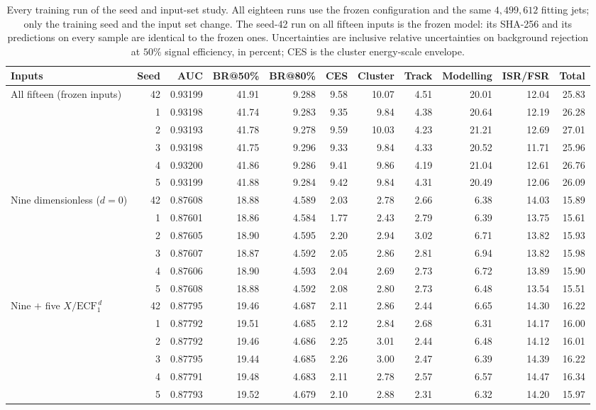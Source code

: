 \begin{table}[!ht]
\centering
\footnotesize
\setlength{\tabcolsep}{3pt}
\caption{Every training run of the seed and input-set study. All eighteen runs use the frozen configuration and the same $4{,}499{,}612$ fitting jets; only the training seed and the input set change. The seed-42 run on all fifteen inputs is the frozen model: its SHA-256 and its predictions on every sample are identical to the frozen ones. Uncertainties are inclusive relative uncertainties on background rejection at $50\%$ signal efficiency, in percent; CES is the cluster energy-scale envelope.}
\label{tab:supp-seed-runs}
\begin{tabular}{lrrrrrrrrrr}
\toprule
Inputs & Seed & AUC & BR@50\% & BR@80\% & CES & Cluster & Track & Modelling & ISR/FSR & Total \\
\midrule
All fifteen (frozen inputs) & 42 & 0.93199 & 41.91 & 9.288 & 9.58 & 10.07 & 4.51 & 20.01 & 12.04 & 25.83 \\
 & 1 & 0.93198 & 41.74 & 9.283 & 9.35 & 9.84 & 4.38 & 20.64 & 12.19 & 26.28 \\
 & 2 & 0.93193 & 41.78 & 9.278 & 9.59 & 10.03 & 4.23 & 21.21 & 12.69 & 27.01 \\
 & 3 & 0.93198 & 41.75 & 9.296 & 9.33 & 9.84 & 4.33 & 20.52 & 11.71 & 25.96 \\
 & 4 & 0.93200 & 41.86 & 9.286 & 9.41 & 9.86 & 4.19 & 21.04 & 12.61 & 26.76 \\
 & 5 & 0.93199 & 41.88 & 9.284 & 9.42 & 9.84 & 4.31 & 20.49 & 12.06 & 26.09 \\
\midrule
Nine dimensionless ($d=0$) & 42 & 0.87608 & 18.88 & 4.589 & 2.03 & 2.78 & 2.66 & 6.38 & 14.03 & 15.89 \\
 & 1 & 0.87601 & 18.86 & 4.584 & 1.77 & 2.43 & 2.79 & 6.39 & 13.75 & 15.61 \\
 & 2 & 0.87605 & 18.90 & 4.595 & 2.20 & 2.94 & 3.02 & 6.71 & 13.82 & 15.93 \\
 & 3 & 0.87607 & 18.87 & 4.592 & 2.05 & 2.86 & 2.81 & 6.94 & 13.82 & 15.98 \\
 & 4 & 0.87606 & 18.90 & 4.593 & 2.04 & 2.69 & 2.73 & 6.72 & 13.89 & 15.90 \\
 & 5 & 0.87608 & 18.88 & 4.592 & 2.08 & 2.80 & 2.73 & 6.48 & 13.54 & 15.51 \\
\midrule
Nine $+$ five $X/\mathrm{ECF}_1^{\,d}$ & 42 & 0.87795 & 19.46 & 4.687 & 2.11 & 2.86 & 2.44 & 6.65 & 14.30 & 16.22 \\
 & 1 & 0.87792 & 19.51 & 4.685 & 2.12 & 2.84 & 2.68 & 6.31 & 14.17 & 16.00 \\
 & 2 & 0.87792 & 19.46 & 4.686 & 2.25 & 3.01 & 2.44 & 6.48 & 14.12 & 16.01 \\
 & 3 & 0.87795 & 19.44 & 4.685 & 2.26 & 3.00 & 2.47 & 6.39 & 14.39 & 16.22 \\
 & 4 & 0.87791 & 19.48 & 4.683 & 2.11 & 2.78 & 2.57 & 6.57 & 14.47 & 16.34 \\
 & 5 & 0.87793 & 19.52 & 4.679 & 2.10 & 2.88 & 2.31 & 6.32 & 14.20 & 15.97 \\
\bottomrule
\end{tabular}
\end{table}
